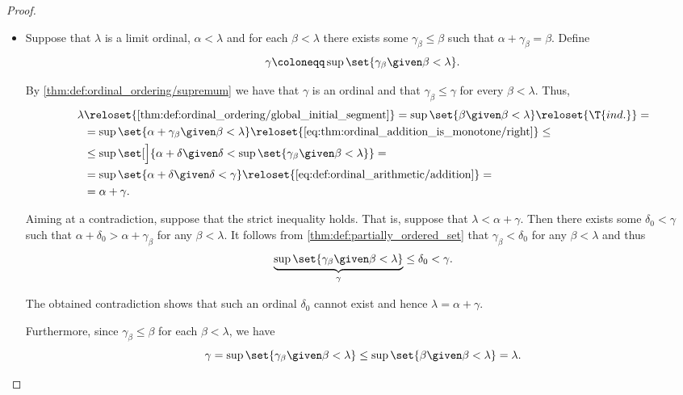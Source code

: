 \begin{proof}
\begin{itemize}
    \item Suppose that \( \lambda \) is a limit ordinal, \( \alpha < \lambda \) and for each \( \beta < \lambda \) there exists some \( \gamma_\beta \leq \beta \) such that \( \alpha + \gamma_\beta = \beta \). Define
    \begin{equation*}
      \gamma \coloneqq \sup\set{ \gamma_\beta \given \beta < \lambda }.
    \end{equation*}

    By \cref{thm:def:ordinal_ordering/supremum} we have that \( \gamma \) is an ordinal and that \( \gamma_\beta \leq \gamma \) for every \( \beta < \lambda \). Thus,
    \begin{align*}
      \lambda
      &\reloset {\ref{thm:def:ordinal_ordering/global_initial_segment}} =
      \sup\set{ \beta \given \beta < \lambda }
      \reloset {\T{ind.}} = \\ &=
      \sup\set{ \alpha + \gamma_\beta \given \beta < \lambda }
      \reloset {\eqref{eq:thm:ordinal_addition_is_monotone/right}} \leq \\ &\leq
      \sup\set[\Big]{ \alpha + \delta \given \delta < \sup\set{ \gamma_\beta \given \beta < \lambda } }
      = \\ &=
      \sup\set{ \alpha + \delta \given \delta < \gamma }
      \reloset {\eqref{eq:def:ordinal_arithmetic/addition}} = \\ &=
      \alpha + \gamma.
    \end{align*}

    Aiming at a contradiction, suppose that the strict inequality holds. That is, suppose that \( \lambda < \alpha + \gamma \). Then there exists some \( \delta_0 < \gamma \) such that \( \alpha + \delta_0 > \alpha + \gamma_\beta \) for any \( \beta < \lambda \). It follows from \cref{thm:def:partially_ordered_set} that \( \gamma_\beta < \delta_0 \) for any \( \beta < \lambda \) and thus
    \begin{equation*}
      \underbrace{\sup\set{ \gamma_\beta \given \beta < \lambda }}_{\gamma} \leq \delta_0 < \gamma.
    \end{equation*}

    The obtained contradiction shows that such an ordinal \( \delta_0 \) cannot exist and hence \( \lambda = \alpha + \gamma \).

    Furthermore, since \( \gamma_\beta \leq \beta \) for each \( \beta < \lambda \), we have
    \begin{equation*}
      \gamma
      =
      \sup\set{ \gamma_\beta \given \beta < \lambda }
      \leq
      \sup\set{ \beta \given \beta < \lambda }
      =
      \lambda.
    \end{equation*}
  \end{itemize}


\end{proof}

